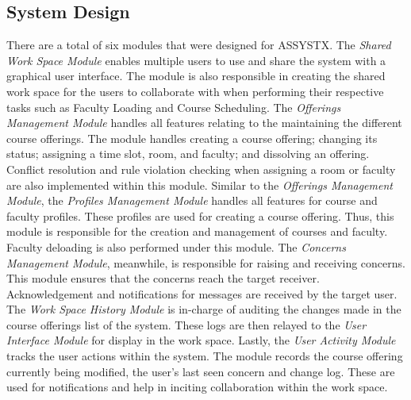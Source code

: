 \subsection{System Design}
There are a total of six modules that were designed for ASSYSTX. The \textit{Shared Work Space Module} enables multiple users to use and share the system with a graphical user interface. The module is also responsible in creating the shared work space for the users to collaborate with when performing their respective tasks such as Faculty Loading and Course Scheduling. The \textit{Offerings Management Module} handles all features relating to the maintaining the different course offerings. The module handles creating a course offering; changing its status; assigning a time slot, room, and faculty; and dissolving an offering. Conflict resolution and rule violation checking when assigning a room or faculty are also implemented within this module. Similar to the \textit{Offerings Management Module}, the \textit{Profiles Management Module} handles all features for course and faculty profiles. These profiles are used for creating a course offering. Thus, this module is responsible for the creation and management of courses and faculty. Faculty deloading is also performed under this module. The \textit{Concerns Management Module}, meanwhile, is responsible for raising and receiving concerns. This module ensures that the concerns reach the target receiver. Acknowledgement and notifications for messages are received by the target user. The \textit{Work Space History Module} is in-charge of auditing the changes made in the course offerings list of the system. These logs are then relayed to the \textit{User Interface Module} for display in the work space. Lastly, the \textit{User Activity Module} tracks the user actions within the system. The module records the course offering currently being modified, the user's last seen concern and change log. These are used for notifications and help in inciting collaboration within the work space.
